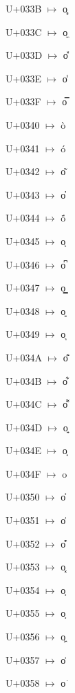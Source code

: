 {\noindent U+033B  $\mapsto$ {\cdmformat o̻}\par
\noindent U+033C  $\mapsto$ {\cdmformat o̼}\par
\noindent U+033D  $\mapsto$ {\cdmformat o̽}\par
\noindent U+033E  $\mapsto$ {\cdmformat o̾}\par
\noindent U+033F  $\mapsto$ {\cdmformat o̿}\par
\noindent U+0340  $\mapsto$ {\cdmformat ò}\par
\noindent U+0341  $\mapsto$ {\cdmformat ó}\par
\noindent U+0342  $\mapsto$ {\cdmformat o͂}\par
\noindent U+0343  $\mapsto$ {\cdmformat o̓}\par
\noindent U+0344  $\mapsto$ {\cdmformat ö́}\par
\noindent U+0345  $\mapsto$ {\cdmformat oͅ}\par
\noindent U+0346  $\mapsto$ {\cdmformat o͆}\par
\noindent U+0347  $\mapsto$ {\cdmformat o͇}\par
\noindent U+0348  $\mapsto$ {\cdmformat o͈}\par
\noindent U+0349  $\mapsto$ {\cdmformat o͉}\par
\noindent U+034A  $\mapsto$ {\cdmformat o͊}\par
\noindent U+034B  $\mapsto$ {\cdmformat o͋}\par
\noindent U+034C  $\mapsto$ {\cdmformat o͌}\par
\noindent U+034D  $\mapsto$ {\cdmformat o͍}\par
\noindent U+034E  $\mapsto$ {\cdmformat o͎}\par
\noindent U+034F  $\mapsto$ {\cdmformat o͏}\par
\noindent U+0350  $\mapsto$ {\cdmformat o͐}\par
\noindent U+0351  $\mapsto$ {\cdmformat o͑}\par
\noindent U+0352  $\mapsto$ {\cdmformat o͒}\par
\noindent U+0353  $\mapsto$ {\cdmformat o͓}\par
\noindent U+0354  $\mapsto$ {\cdmformat o͔}\par
\noindent U+0355  $\mapsto$ {\cdmformat o͕}\par
\noindent U+0356  $\mapsto$ {\cdmformat o͖}\par
\noindent U+0357  $\mapsto$ {\cdmformat o͗}\par
\noindent U+0358  $\mapsto$ {\cdmformat o͘}\par
}

